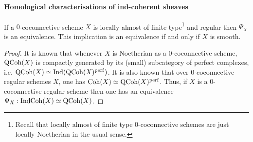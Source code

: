                 \paragraph{Homological characterisations of ind-coherent sheaves}
                    \begin{theorem} \label{theorem: indcoh_on_classically__regular_and_smooth_schemes}
                        If a $0$-coconnective scheme $X$ is locally almost of finite type\footnote{Recall that locally almost of finite type $0$-coconnective schemes are just locally Noetherian in the usual sense.} and regular then $\Psi_X$ is an equivalence. This implication is an equivalence if and only if $X$ is smooth.
                    \end{theorem}
                        \begin{proof}
                            It is known that whenever $X$ is Noetherian as a $0$-coconnective scheme, $\mathrm{QCoh}(X)$ is compactly generated by its (small) subcategory of perfect complexes, i.e. $\mathrm{QCoh}(X) \simeq \mathrm{Ind}(\mathrm{QCoh}(X)^{\mathrm{perf}})$. It is also known that over $0$-coconnective regular schemes $X$, one has $\mathrm{Coh}(X) \simeq \mathrm{QCoh}(X)^{\mathrm{perf}}$. Thus, if $X$ is a $0$-coconnective regular scheme then one has an equivalence $\Psi_X: \mathrm{Ind}\mathrm{Coh}(X) \simeq \mathrm{QCoh}(X)$.
                            
                        \end{proof}
                        
